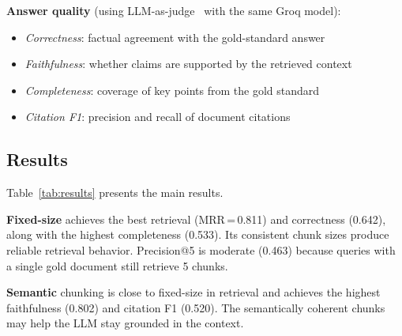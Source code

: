 \documentclass[conference]{IEEEtran}
\begin{document}
\textbf{Answer quality} (using LLM-as-judge~\cite{b7} with the same Groq model):
\begin{itemize}
    \item \textit{Correctness}: factual agreement with the gold-standard answer
    \item \textit{Faithfulness}: whether claims are supported by the retrieved context
    \item \textit{Completeness}: coverage of key points from the gold standard
    \item \textit{Citation F1}: precision and recall of document citations
\end{itemize}

\subsection{Results}

Table~\ref{tab:results} presents the main results.

\begin{table}[htbp]
\caption{Evaluation Results: 30 queries $\times$ 3 strategies}
\begin{center}
\label{tab:results}
\end{center}
\end{table}

\textbf{Fixed-size} achieves the best retrieval (MRR\,=\,0.811) and correctness (0.642), along with the highest completeness (0.533). Its consistent chunk sizes produce reliable retrieval behavior. Precision@5 is moderate (0.463) because queries with a single gold document still retrieve 5 chunks.

\textbf{Semantic} chunking is close to fixed-size in retrieval and achieves the highest faithfulness (0.802) and citation F1 (0.520). The semantically coherent chunks may help the LLM stay grounded in the context.
\end{document}
